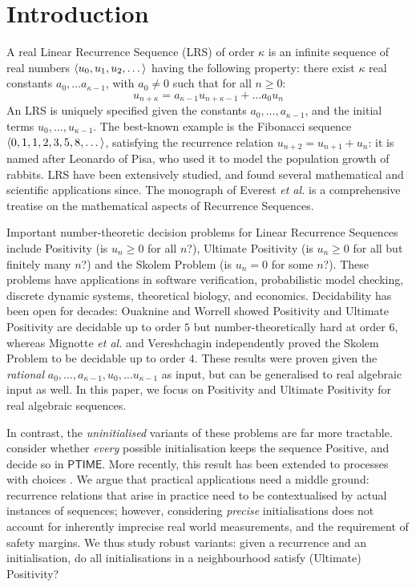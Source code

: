 \section{Introduction}
\label{section:intro}
A real Linear Recurrence Sequence (LRS) of order $\kappa$ is an infinite sequence of real numbers $\langle u_0, u_1, u_2, \dots\rangle$ having the following property: there exist $\kappa$ real constants $a_{0}, \dots a_{\kappa-1}$, with $a_0 \ne 0$ such that for all $n \ge 0$:
\begin{equation}
u_{n+\kappa} = a_{\kappa-1}u_{n+\kappa-1} + \dots a_0 u_n
\end{equation}
An LRS is uniquely specified given the constants $a_0, \dots, a_{\kappa-1}$, and the initial terms $u_0, \dots, u_{\kappa-1}$. The best-known example is the Fibonacci sequence $\langle0, 1, 1, 2, 3, 5, 8, \dots\rangle$, satisfying the recurrence relation $u_{n+2} = u_{n+1} + u_n$: it is named after Leonardo of Pisa, who used it to model the population growth of rabbits. LRS have been extensively studied, and found several mathematical and scientific applications since. The monograph of Everest \textit{et al.} \cite{Everest2003RecurrenceS} is a comprehensive treatise on the mathematical aspects of Recurrence Sequences.

Important number-theoretic decision problems for Linear Recurrence Sequences include Positivity (is $u_n \ge 0$ for all $n$?), Ultimate Positivity (is $u_n \ge 0$ for all but finitely many $n$?) and the Skolem Problem (is $u_n = 0$ for some $n$?). These problems have applications in software verification, probabilistic model checking, discrete dynamic systems, theoretical biology, and economics. Decidability has been open for decades: Ouaknine and Worrell \cite{joeljames3} showed Positivity and Ultimate Positivity are decidable up to order $5$ but number-theoretically hard at order $6$, whereas Mignotte \textit{et al.} \cite{mignotte} and Vereshchagin \cite{vereshchagin} independently proved the Skolem Problem to be decidable up to order $4$. These results were proven given the \textit{rational} $a_0, \dots, a_{\kappa-1}, u_0, \dots u_{\kappa-1}$ as input, but can be generalised to real algebraic input as well. In this paper, we focus on Positivity and Ultimate Positivity for real algebraic sequences.

In contrast, the \textit{uninitialised} variants of these problems are far more tractable. \cite{Braverman06,Tiwari04} consider whether \textit{every} possible initialisation keeps the sequence Positive, and decide so in $\mathsf{PTIME}$. More recently, this result has been extended to processes with choices \cite{AGV18}. We argue that practical applications need a middle ground: recurrence relations that arise in practice need to be contextualised by actual instances of sequences; however, considering \textit{precise} initialisations does not account for inherently imprecise real world measurements, and the requirement of safety margins. We thus study robust variants: given a recurrence and an initialisation, do all initialisations in a neighbourhood satisfy (Ultimate) Positivity?

